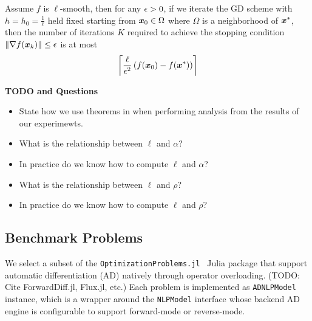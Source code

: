 \documentclass[10pt]{article}
\begin{document}
            \begin{theorem}
                Assume $f$ is $\ell$-smooth, then for any $\epsilon > 0$, if we iterate
                the GD scheme with $h = h_0 = \frac{1}{\ell}$ held fixed starting from
                $\bm{x}_0 \in \Omega$ where $\Omega$ is a neighborhood of $\bm{x}^*$,
                then the number of iterations $K$ required to achieve the stopping condition
                $\| \nabla f(\bm{x}_k) \| \leq \epsilon$ is at most
                $$
                    \left\lceil \frac{\ell}{\epsilon^{2}} \, (f(\bm{x}_0) - f(\bm{x}^*)) \right\rceil
                $$
            \end{theorem}

            \begin{remark}
                \textbf{TODO and Questions}
                \begin{itemize}
                    \item State how we use theorems in when performing analysis from
                    the results of our experimewts.
                    \item What is the relationship between $\ell$ and $\alpha$?
                    \item In practice do we know how to compute $\ell$ and $\alpha$?
                    \item What is the relationship between $\ell$ and $\rho$?
                    \item In practice do we know how to compute $\ell$ and $\rho$?
                \end{itemize}
            \end{remark}

        \medskip
    

    \subsection{Benchmark Problems}
        \label{intro:problems}
        We select a subset of the \texttt{OptimizationProblems.jl}~\cite{OptimizationProblems}
        Julia package that support automatic differentiation (AD) natively through operator
        overloading. (TODO: Cite ForwardDiff.jl, Flux.jl, etc.) Each problem is implemented
        as \texttt{ADNLPModel} instance, which is a wrapper around the \texttt{NLPModel} interface
        whose backend AD engine is configurable to support forward-mode or reverse-mode.

\end{document}
